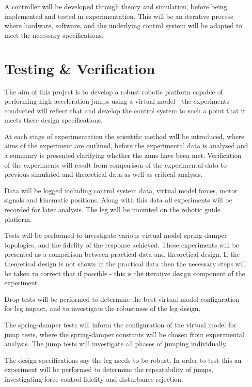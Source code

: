 A controller will be developed through theory and simulation, before being implemented and tested in experimentation. This will be an iterative process where hardware, software, and the underlying control system will be adapted to meet the necessary specifications.

\section{Testing \& Verification}

The aim of this project is to develop a robust robotic platform capable of performing high acceleration jumps using a virtual model - the experiments conducted will reflect that and develop the control system to such a point that it meets these design specifications. 

At each stage of experimentation the scientific method will be introduced, where aims of the experiment are outlined, before the experimental data is analysed and a summary is presented clarifying whether the aims have been met. Verification of the experiments will result from comparison of the experimental data to previous simulated and theoretical data as well as critical analysis.

Data will be logged including control system data, virtual model forces, motor signals and kinematic positions. Along with this data all experiments will be recorded for later analysis. The leg will be mounted on the robotic guide platform.

Tests will be performed to investigate various virtual model spring-damper topologies, and the fidelity of the response achieved. These experiments will be presented as a comparison between practical data and theoretical design. If the theoretical design is not shown in the practical data then the necessary steps will be taken to correct that if possible - this is the iterative design component of the experiment. 

Drop tests will be performed to determine the best virtual model configuration for leg impact, and to investigate the robustness of the leg design.

The spring-damper tests will inform the configuration of the virtual model for jump tests, where the spring-damper constants will be chosen from experimental analysis. The jump tests will investigate all phases of jumping individually. 

The design specifications say the leg needs to be robust. In order to test this an experiment will be performed to determine the repeatability of jumps, investigating force control fidelity and disturbance rejection.

